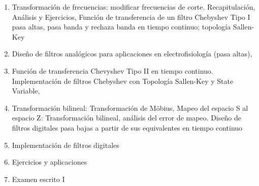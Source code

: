 \begin{enumerate}
  \item Transformación de frecuencias: modificar frecuencias de corte. Recapitulación, Análisis y Ejercicios, Función de transferencia de un filtro Chebyshev Tipo I pasa altas, pasa banda y rechaza banda en tiempo continuo; topología Sallen-Key
  \item Diseño de filtros analógicos para aplicaciones en electrofisiología (pasa altas), 
  \item Función de transferencia Chevyshev Tipo II en tiempo continuo. Implementación de filtros Chebyshev con Topología Sallen-Key y State Variable, 
  \item Transformación bilineal: Transformación de M\"{o}bius, Mapeo del espacio S al espacio Z: Transformación bilineal, análisis del error de mapeo. Diseño de filtros digitales pasa bajas a partir de sus equivalentes en tiempo continuo
  \item Implementación de filtros digitales 
  \item Ejercicios y aplicaciones
  \item Examen escrito I
\end{enumerate}